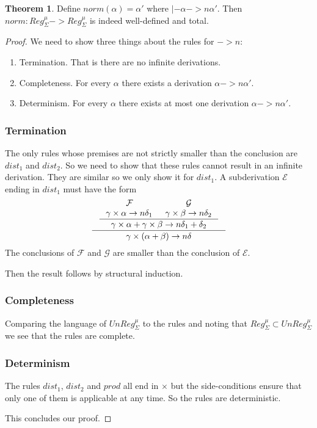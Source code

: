 \documentclass[a4paper, oneside]{memoir}
\theoremstyle{definition}
\newtheorem{theorem}{Theorem}
\begin{document}
\begin{theorem}
  Define $norm(\alpha) = \alpha'$ where $|- \alpha ->n \alpha'$. Then $norm :
  Reg_{\Sigma}^{\mu} -> Reg_{\Sigma}^{\mu}$ is indeed well-defined and total.

  \begin{proof}
    We need to show three things about the rules for $->n$:
    \begin{enumerate}
    \item Termination. That is there are no infinite derivations.
    \item Completeness. For every $\alpha$ there exists a derivation $\alpha ->n
      \alpha'$.
    \item Determinism. For every $\alpha$ there exists at most one derivation
      $\alpha ->n \alpha'$.
    \end{enumerate}
    \subsubsection{Termination}
    The only rules whose premises are not strictly smaller than the conclusion
    are $dist_1$ and $dist_2$. So we need to show that these rules cannot result
    in an infinite derivation. They are similar so we only show it for
    $dist_1$. A subderivation $\mathcal{E}$ ending in $dist_1$ must have the
    form
    \[
    \inference{\inference{\mathcal{F} & \mathcal{G} \\ \gamma \times \alpha ->n
        \delta_1 & \gamma \times \beta ->n \delta_2 }{\gamma \times \alpha +
        \gamma \times \beta ->n \delta_1 + \delta_2}}{\gamma \times (\alpha +
      \beta) ->n \delta}
    \]
    The conclusions of $\mathcal{F}$ and $\mathcal{G}$ are smaller than the
    conclusion of $\mathcal{E}$.

    Then the result follows by structural induction.

    \subsubsection{Completeness}
    Comparing the language of $UnReg_{\Sigma}^{\mu}$ to the rules and noting
    that $Reg_{\Sigma}^{\mu} \subset UnReg_{\Sigma}^{\mu}$ we see that the rules
    are complete.

    \subsubsection{Determinism}
    The rules $dist_1$, $dist_2$ and $prod$ all end in $\times$ but the
    side-conditions ensure that only one of them is applicable at any time. So
    the rules are deterministic.

    This concludes our proof.
  \end{proof}
\end{theorem}
\end{document}
